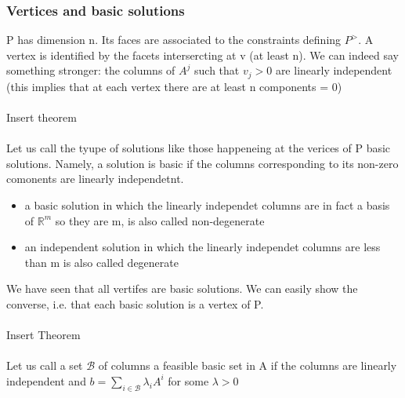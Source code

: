  \subsubsection*{Vertices and basic solutions}
 P has dimension n. Its faces are associated to the constraints defining $P^>$. A vertex is identified by the facets intersercting at v (at least n). We can indeed say something stronger: the columns of $ A^j $ such that $ v_j>0 $ are linearly independent (this implies that at each vertex there are at least n components = 0)
\\\\Insert theorem\\\\
Let us call the tyupe of solutions like those happeneing at the verices of P basic solutions. Namely, a solution is basic if the columns corresponding to its non-zero comonents are linearly independetnt.
\begin{itemize}
    \item a basic solution in which the linearly independet columns are in fact a basis of $ \mathbb{R}^{m} $ so they are m, is also called non-degenerate
    \item an independent solution in which the linearly independet columns are less than m is also called degenerate  
\end{itemize}
We have seen that all vertifes are basic solutions. We can easily show the converse, i.e. that each basic solution is a vertex of P.
\\\\Insert Theorem\\\\
Let us call a set $ \mathcal{B} $ of columns a feasible basic set in A if the columns are linearly independent and $ b= \sum_{i\in\mathcal{B}}{\lambda_iA^i}$ for some $ \lambda >0 $

